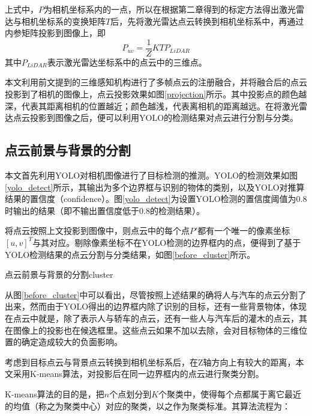 上式中，$P$为相机坐标系内的一点，所以在根据第二章得到的标定方法得出激光雷达与相机坐标系的变换矩阵$T$后，先将激光雷达点云转换到相机坐标系中，再通过内参矩阵投影到图像上，即
\begin{equation}
    P_{uv} = \frac{1}{Z} KTP_{LiDAR}
\end{equation}
其中$P_{LiDAR}$表示激光雷达坐标系中的点云中的三维点。

本文利用前文提到的三维感知机构进行了多帧点云的注册融合，并将融合后的点云投影到了相机的图像上，点云投影效果如图\ref{projection}所示。其中投影点的颜色越深，代表其距离相机的位置越近；颜色越浅，代表离相机的距离越远。在将激光雷达点云投影到图像之后，便可以利用YOLO的检测结果对点云进行分割与分类。

\subsection{点云前景与背景的分割}
本文首先利用YOLO对相机图像进行了目标检测的推测。YOLO的检测效果如图\ref{yolo_detect}所示，其输出为多个边界框与识别的物体的类别，以及YOLO对推算结果的置信度（confidence）。图\ref{yolo_detect}为设置YOLO检测的置信度阈值为0.8时输出的结果（即不输出置信度低于0.8的检测结果）。

将点云按照上文投影到图像中，则点云中的每个点$P'$都有一个唯一的像素坐标$[u,v]^T$与其对应。剔除像素坐标不在YOLO检测的边界框内的点，便得到了基于YOLO检测结果的点云分割与分类结果，如图\ref{before_cluster}所示。
\begin{pics}[htbp]{点云前景与背景的分割}{cluster}
\end{pics}

从图\ref{before_cluster}中可以看出，尽管按照上述结果的确将人与汽车的点云分割了出来，然而由于YOLO得出的边界框内除了识别的目标，还有一些背景物体，体现在点云中就是，除了表示人与轿车的点云，还有一些人与汽车后的灌木的点云，其在图像上的投影也在候选框里。这些点云如果不加以去除，会对目标物体的三维位置的确定造成较大的负面影响。

考虑到目标点云与背景点云转换到相机坐标系后，在Z轴方向上有较大的距离，本文采用K-means算法，对投影后在同一边界框内的点云进行聚类分割。

K-means算法的目的是，把$n$个点划分到$K$个聚类中，使得每个点都属于离它最近的均值（称之为聚类中心）对应的聚类，以之作为聚类标准。其算法流程为：

